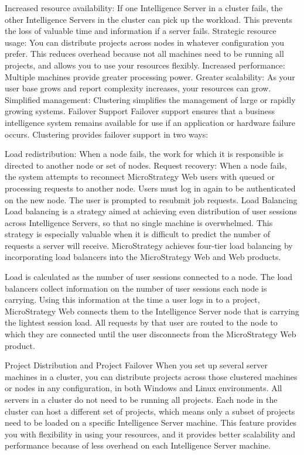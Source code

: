 \documentclass[12pt]{article}
\begin{document}
Increased resource availability: If one Intelligence Server in a cluster fails, the other Intelligence Servers in the cluster can pick up the workload. This prevents the loss of valuable time and information if a server fails.
Strategic resource usage: You can distribute projects across nodes in whatever configuration you prefer. This reduces overhead because not all machines need to be running all projects, and allows you to use your resources flexibly.
Increased performance: Multiple machines provide greater processing power.
Greater scalability: As your user base grows and report complexity increases, your resources can grow.
Simplified management: Clustering simplifies the management of large or rapidly growing systems.
Failover Support
Failover support ensures that a business intelligence system remains available for use if an application or hardware failure occurs. Clustering provides failover support in two ways:

Load redistribution: When a node fails, the work for which it is responsible is directed to another node or set of nodes.
Request recovery: When a node fails, the system attempts to reconnect MicroStrategy Web users with queued or processing requests to another node. Users must log in again to be authenticated on the new node. The user is prompted to resubmit job requests.
Load Balancing
Load balancing is a strategy aimed at achieving even distribution of user sessions across Intelligence Servers, so that no single machine is overwhelmed. This strategy is especially valuable when it is difficult to predict the number of requests a server will receive. MicroStrategy achieves four-tier load balancing by incorporating load balancers into the MicroStrategy Web and Web products.

Load is calculated as the number of user sessions connected to a node. The load balancers collect information on the number of user sessions each node is carrying. Using this information at the time a user logs in to a project, MicroStrategy Web connects them to the Intelligence Server node that is carrying the lightest session load. All requests by that user are routed to the node to which they are connected until the user disconnects from the MicroStrategy Web product.

Project Distribution and Project Failover
When you set up several server machines in a cluster, you can distribute projects across those clustered machines or nodes in any configuration, in both Windows and Linux environments. All servers in a cluster do not need to be running all projects. Each node in the cluster can host a different set of projects, which means only a subset of projects need to be loaded on a specific Intelligence Server machine. This feature provides you with flexibility in using your resources, and it provides better scalability and performance because of less overhead on each Intelligence Server machine.
\end{document}
